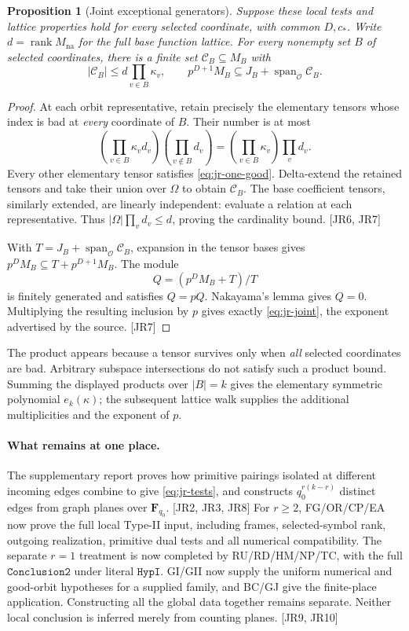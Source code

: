 \documentclass[11pt,a4paper]{article}
\numberwithin{equation}{section}
\newtheorem{proposition}[theorem]{Proposition}
\theoremstyle{remark}\newtheorem{remark}[theorem]{Remark}
\begin{document}
\begin{proposition}[Joint exceptional generators]\label{prop:jr-joint}
Suppose these local tests and lattice properties hold for every selected coordinate, with common $D,c_*$. Write $d=\operatorname{rank}M_{\mathrm{na}}$ for the full base function lattice. For every nonempty set $B$ of selected coordinates, there is a finite set $\mathcal C_B\subseteq M_B$ with
\begin{equation}\label{eq:jr-joint}
 |\mathcal C_B|\le d\prod_{v\in B}\kappa_v,
 \qquad
 p^{D+1}M_B\subseteq J_B+\operatorname{span}_{\mathcal O}\mathcal C_B.
\end{equation}
\end{proposition}
\begin{proof}
At each orbit representative, retain precisely the elementary tensors whose index is bad at \emph{every} coordinate of $B$. Their number is at most
\[
 \left(\prod_{v\in B}\kappa_vd_v\right)
 \left(\prod_{v\notin B}d_v\right)
   =\left(\prod_{v\in B}\kappa_v\right)\prod_v d_v.
\]
Every other elementary tensor satisfies \eqref{eq:jr-one-good}. Delta-extend the retained tensors and take their union over $\Omega$ to obtain $\mathcal C_B$. The base coefficient tensors, similarly extended, are linearly independent: evaluate a relation at each representative. Thus $|\Omega|\prod_vd_v\le d$, proving the cardinality bound. \textsf{[JR6, JR7]}

With $T=J_B+\operatorname{span}_{\mathcal O}\mathcal C_B$, expansion in the tensor bases gives $p^DM_B\subseteq T+p^{D+1}M_B$. The module
\[
 Q=(p^DM_B+T)/T
\]
is finitely generated and satisfies $Q=pQ$. Nakayama's lemma gives $Q=0$. Multiplying the resulting inclusion by $p$ gives exactly \eqref{eq:jr-joint}, the exponent advertised by the source. \textsf{[JR7]}
\end{proof}

The product appears because a tensor survives only when \emph{all} selected coordinates are bad. Arbitrary subspace intersections do not satisfy such a product bound. Summing the displayed products over $|B|=k$ gives the elementary symmetric polynomial $e_k(\kappa)$; the subsequent lattice walk supplies the additional multiplicities and the exponent of $p$.

\paragraph{What remains at one place.}
The supplementary report proves how primitive pairings isolated at different incoming edges combine to give \eqref{eq:jr-tests}, and constructs $q_0^{r(k-r)}$ distinct edges from graph planes over $\mathbf F_{q_0}$. \textsf{[JR2, JR3, JR8]} For $r\ge2$, FG/OR/CP/EA now prove the full local Type-II input, including frames, selected-symbol rank, outgoing realization, primitive dual tests and all numerical compatibility. The separate $r=1$ treatment is now completed by RU/RD/HM/NP/TC, with the full $\texttt{Conclusion2}$ under literal $\texttt{HypI}$. GI/GII now supply the uniform numerical and good-orbit hypotheses for a supplied family, and BC/GJ give the finite-place application. Constructing all the global data together remains separate. Neither local conclusion is inferred merely from counting planes. \textsf{[JR9, JR10]}
\end{document}

